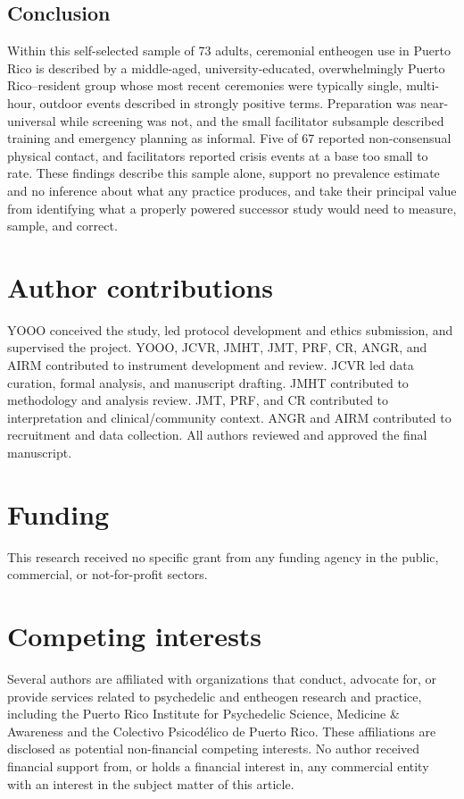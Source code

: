 \documentclass[12pt]{article}
\begin{document}
\subsection{Conclusion}

Within this self-selected sample of 73 adults, ceremonial entheogen use in Puerto Rico is described by a
middle-aged, university-educated, overwhelmingly Puerto Rico--resident group whose most recent ceremonies
were typically single, multi-hour, outdoor events described in strongly positive terms. Preparation was
near-universal while screening was not, and the small facilitator subsample described training and
emergency planning as informal. Five of 67 reported non-consensual physical contact, and facilitators
reported crisis events at a base too small to rate. These findings describe this sample alone, support no
prevalence estimate and no inference about what any practice produces, and take their principal value from
identifying what a properly powered successor study would need to measure, sample, and correct.

\section*{Author contributions}
YOOO conceived the study, led protocol development and ethics submission, and supervised the project.
YOOO, JCVR, JMHT, JMT, PRF, CR, ANGR, and AIRM contributed to instrument development and review. JCVR led
data curation, formal analysis, and manuscript drafting. JMHT contributed to methodology and analysis
review. JMT, PRF, and CR contributed to interpretation and clinical/community context. ANGR and AIRM
contributed to recruitment and data collection. All authors reviewed and approved the final manuscript.

\section*{Funding}
This research received no specific grant from any funding agency in the public, commercial, or
not-for-profit sectors.

\section*{Competing interests}
Several authors are affiliated with organizations that conduct, advocate for, or provide services related
to psychedelic and entheogen research and practice, including the Puerto Rico Institute for Psychedelic
Science, Medicine \& Awareness and the Colectivo Psicod\'elico de Puerto Rico. These affiliations are
disclosed as potential non-financial competing interests. No author received financial support from, or
holds a financial interest in, any commercial entity with an interest in the subject matter of this
article.
\end{document}
